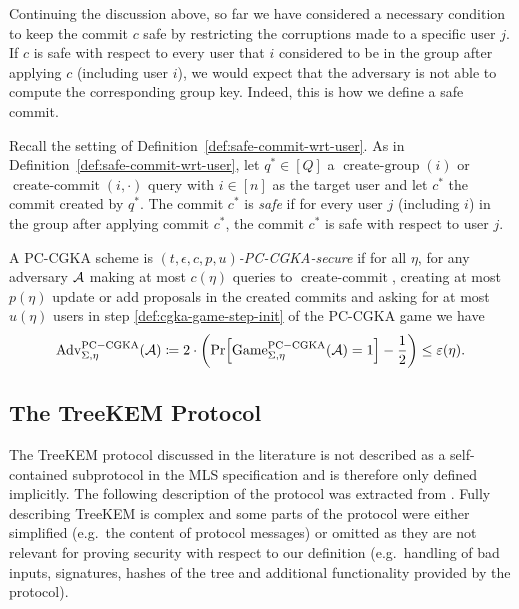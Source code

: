 
Continuing the discussion above, so far we have considered a necessary condition to keep the commit $c$ safe by restricting the corruptions made to a specific user $j$. If $c$ is safe with respect to every user that $i$ considered to be in the group after applying $c$ (including user $i$), we would expect that the adversary is not able to compute the corresponding group key. Indeed, this is how we define a safe commit.

\begin{definition} \label{def:safe-commit}
	Recall the setting of Definition~\ref{def:safe-commit-wrt-user}. As in Definition~\ref{def:safe-commit-wrt-user}, let $q^* \in [Q]$ a $\operatorname{create-group}(i)$ or $\operatorname{create-commit}(i, \cdot)$ query with $i \in [n]$ as the target user and let $c^*$ the commit created by $q^*$. The commit $c^*$ is \emph{safe} if for every user $j$ (including $i$) in the group after applying commit $c^*$, the commit $c^*$ is safe with respect to user $j$.
\end{definition}

\begin{definition}
	A PC-CGKA scheme is \emph{$(t, \epsilon, c, p, u)$-PC-CGKA-secure} if for all $\eta$, for any adversary $\mathcal{A}$ making at most $c(\eta)$ queries to $\operatorname{create-commit}$, creating at most $p(\eta)$ update or add proposals in the created commits and asking for at most $u(\eta)$ users in step \ref{def:cgka-game-step-init} of the PC-CGKA game we have
	\begin{align*}
		\advantage{\Sigma}{\eta}{PC-CGKA}(\adv) \coloneqq 2 \cdot \left(\pr{\game{\Sigma}{\eta}{PC-CGKA}(\adv) = 1} - \frac{1}{2}\right) \le \epsilon(\eta).
	\end{align*}
\end{definition}

\subsection{The TreeKEM Protocol}

The TreeKEM protocol discussed in the literature is not described as a self-contained subprotocol in the MLS specification \cite{rfc9420} and is therefore only defined implicitly. The following description of the protocol was extracted from \cite{rfc9420}. Fully describing TreeKEM is complex and some parts of the protocol were either simplified (e.g.\ the content of protocol messages) or omitted as they are not relevant for proving security with respect to our definition (e.g.\ handling of bad inputs, signatures, hashes of the tree and additional functionality provided by the protocol).

